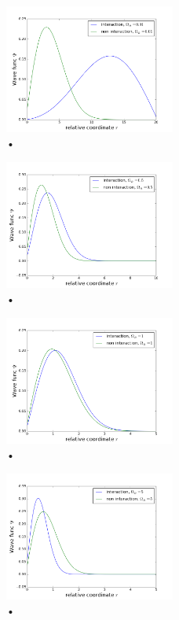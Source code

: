 \documentclass[%
 reprint,
 nobalancelastpage,
 amsmath,amssymb,
 aps,
]{revtex4-1}
\begin{document}
 \begin{figure}[h]
\centering
\includegraphics[width=0.5\textwidth]{../omega001.png}
\caption{•}
\label{fig:my_label}
\end{figure}

 \begin{figure}[h]
\centering
\includegraphics[width=0.5\textwidth]{../omega05.png}
\caption{•}
\label{fig:my_label}
\end{figure}

 \begin{figure}[h]
\centering
\includegraphics[width=0.5\textwidth]{../omega1.png}
\caption{•}
\label{fig:my_label}
\end{figure}

 \begin{figure}[h]
\centering
\includegraphics[width=0.5\textwidth]{../omega5.png}
\caption{•}
\label{fig:my_label}
\end{figure}
\end{document}
